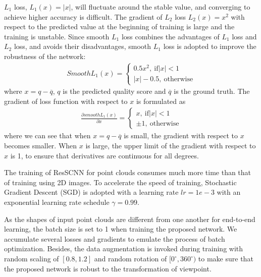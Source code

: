 \documentclass[acmsmall]{acmart}
\begin{document}
\par $L_1$ loss, $L_1(x)=|x|$, will fluctuate around the stable value, and converging to achieve higher accuracy is difficult. The gradient of $L_2$ loss $L_2(x)=x^2$ with respect to the predicted value at the beginning of training is large and the training is unstable. Since smooth $L_1$ loss combines the advantages of $L_1$ loss and $L_2$ loss, and avoids their disadvantages, smooth $L_1$ loss is adopted to improve the robustness of the network:
\begin{align}
Smooth{L_1}(x) = \left\{ {\begin{array}{*{20}{c}}
{0.5{x^2},~\text{if}\left| x \right| < 1}\\
{\left| x \right| - 0.5,~\text{otherwise}}
\end{array}} \right.
\end{align}
where $x = q - \overline q $, $q$ is the predicted quality score and $\overline q$ is the ground truth. The gradient of loss function with respect to $x$ is formulated as
\begin{align}
\frac{{\partial smooth{L_1}(x)}}{{\partial x}} = \left\{ {\begin{array}{*{20}{c}}
{x,~\text{if}\left| x \right| < 1}\\
{ \pm 1,~\text{otherwise}}
\end{array}} \right.
\end{align}
where we can see that when $x = q - \overline q $ is small, the gradient with respect to $x$ becomes smaller. When $x$ is large, the upper limit of the gradient with respect to $x$ is 1, to ensure that derivatives are continuous for all degrees.

\par The training of ResSCNN for point clouds consumes much more time than that of training using 2D images. To accelerate the speed of training, Stochastic Gradient Descent (SGD) is adopted with a learning rate $lr = 1e-3$ with an exponential learning rate schedule $\gamma  = 0.99$.

\par As the shapes of input point clouds are different from one another for end-to-end learning, the batch size is set to 1 when training the proposed network. We accumulate several losses and gradients to emulate the process of batch optimization. Besides, the data augmentation is invoked during training with random scaling of $[0.8,1.2]$ and random rotation of $[{0^\circ },{360^\circ })$ to make sure that the proposed network is robust to the transformation of viewpoint.
\end{document}
